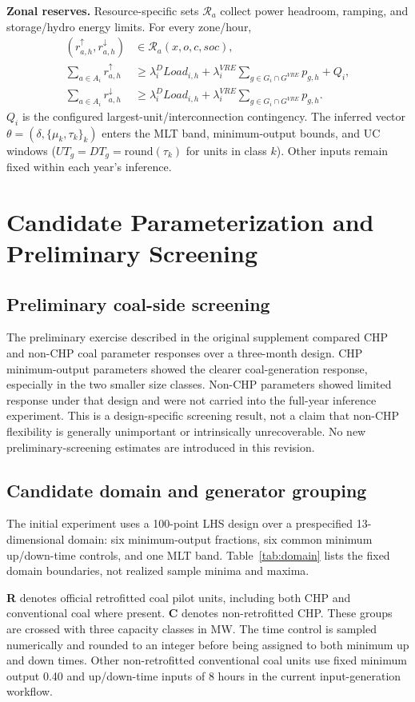 \documentclass[11pt,a4paper]{article}
\newcommand{\family}[1]{\textbf{#1}}
\begin{document}
\family{Zonal reserves.} Resource-specific sets $\mathcal R_a$ collect power
headroom, ramping, and storage/hydro energy limits. For every zone/hour,
\begin{align}
(r^\uparrow_{a,h},r^\downarrow_{a,h})&\in\mathcal R_a(x,o,c,soc),\nonumber\\
\sum_{a\in A_i}r^\uparrow_{a,h}&\ge\lambda_i^DLoad_{i,h}
+\lambda_i^{VRE}\sum_{g\in G_i\cap G^{VRE}}p_{g,h}+Q_i,\\
\sum_{a\in A_i}r^\downarrow_{a,h}&\ge\lambda_i^DLoad_{i,h}
+\lambda_i^{VRE}\sum_{g\in G_i\cap G^{VRE}}p_{g,h}.
\end{align}
$Q_i$ is the configured largest-unit/interconnection contingency. The
inferred vector $\theta=(\delta,\{\mu_k,\tau_k\}_k)$ enters the MLT band,
minimum-output bounds, and UC windows ($UT_g=DT_g=\mathrm{round}(\tau_k)$
for units in class $k$). Other inputs remain fixed within each year's inference.

\newpage
\section{Candidate Parameterization and Preliminary Screening}
\subsection{Preliminary coal-side screening}
The preliminary exercise described in the original supplement compared CHP
and non-CHP coal parameter responses over a three-month design. CHP
minimum-output parameters showed the clearer coal-generation response,
especially in the two smaller size classes. Non-CHP parameters showed limited
response under that design and were not carried into the full-year inference
experiment. This is a design-specific screening result, not a claim that
non-CHP flexibility is generally unimportant or intrinsically unrecoverable.
No new preliminary-screening estimates are introduced in this revision.

\subsection{Candidate domain and generator grouping}
The initial experiment uses a 100-point LHS design over a prespecified
13-dimensional domain: six minimum-output fractions, six common minimum
up/down-time controls, and one MLT band. Table~\ref{tab:domain} lists the
fixed domain boundaries, not realized sample minima and maxima.

\textbf{R} denotes official retrofitted coal pilot units, including both CHP
and conventional coal where present. \textbf{C} denotes non-retrofitted CHP.
These groups are crossed with three capacity classes in MW. The time control
is sampled numerically and rounded to an integer before being assigned to
both minimum up and down times. Other non-retrofitted conventional coal
units use fixed minimum output 0.40 and up/down-time inputs of 8 hours in
the current input-generation workflow.
\end{document}
